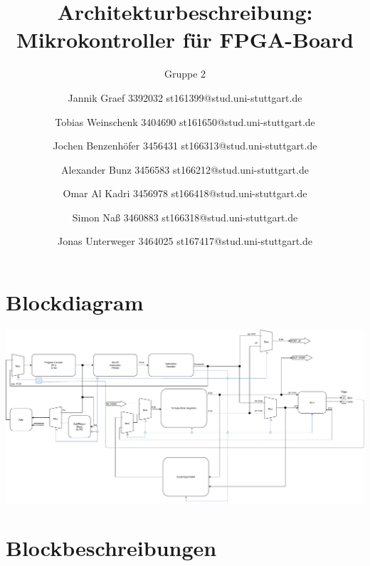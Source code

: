 \documentclass{scrartcl}
\begin{document}
\title{Architekturbeschreibung: Mikrokontroller für FPGA-Board}
\subtitle{Gruppe 2}
\author{Jannik Graef 3392032 st161399@stud.uni-stuttgart.de \and
 Tobias Weinschenk 3404690 st161650@stud.uni-stuttgart.de \and
 Jochen Benzenhöfer 3456431 st166313@stud.uni-stuttgart.de \and
 Alexander Bunz 3456583 st166212@stud.uni-stuttgart.de \and
 Omar Al Kadri 3456978 st166418@stud.uni-stuttgart.de \and
 Simon Naß 3460883 st166318@stud.uni-stuttgart.de \and
 Jonas Unterweger 3464025 st167417@stud.uni-stuttgart.de}
\maketitle


\section{Blockdiagram}
    \includegraphics[width=\textwidth]{Blockdiagram.pdf}


\section{Blockbeschreibungen}
\end{document}
